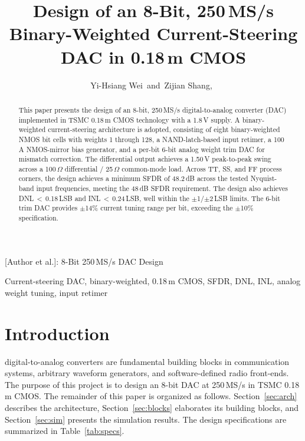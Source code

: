 \documentclass[lettersize,journal]{IEEEtran}
\begin{document}
\title{Design of an 8-Bit, 250\,MS/s Binary-Weighted Current-Steering DAC in 0.18\,\textmu m CMOS}

\author{Yi-Hsiang Wei~and~Zijian Shang,~
        }

%
{[Author et al.]: 8-Bit 250\,MS/s DAC Design}

\maketitle

\begin{abstract}
This paper presents the design of an 8-bit, 250\,MS/s digital-to-analog converter (DAC)
implemented in TSMC 0.18\,\textmu m CMOS technology with a 1.8\,V supply.
A binary-weighted current-steering architecture is adopted, consisting of eight
binary-weighted NMOS bit cells with weights 1 through 128, a NAND-latch-based
input retimer, a 100\,\textmu A NMOS-mirror bias generator, and a per-bit 6-bit
analog weight trim DAC for mismatch correction.
The differential output achieves a 1.50\,V peak-to-peak swing across a
100\,$\Omega$ differential / 25\,$\Omega$ common-mode load.
Across TT, SS, and FF process corners, the design achieves a minimum SFDR of
48.2\,dB across the tested Nyquist-band input frequencies, meeting the 48\,dB
SFDR requirement. The design also achieves DNL\,$<$\,0.18\,LSB and
INL\,$<$\,0.24\,LSB, well within the $\pm$1/$\pm$2\,LSB limits.
The 6-bit trim DAC provides $\pm$14\% current tuning range per bit,
exceeding the $\pm$10\% specification.
\end{abstract}

\begin{IEEEkeywords}
Current-steering DAC, binary-weighted, 0.18\,\textmu m CMOS, SFDR, DNL, INL, analog weight tuning, input retimer
\end{IEEEkeywords}

\section{Introduction}
 digital-to-analog converters are fundamental building
blocks in communication systems, arbitrary waveform generators, and software-defined
radio front-ends. The purpose of this project is to design an 8-bit DAC at 250\,MS/s
in TSMC 0.18\,\textmu m CMOS. The remainder of this paper
is organized as follows. Section~\ref{sec:arch} describes the architecture,
Section~\ref{sec:blocks} elaborates its building blocks, and
Section~\ref{sec:sim} presents the simulation results.
The design specifications are summarized in Table~\ref{tab:specs}.
\end{document}
